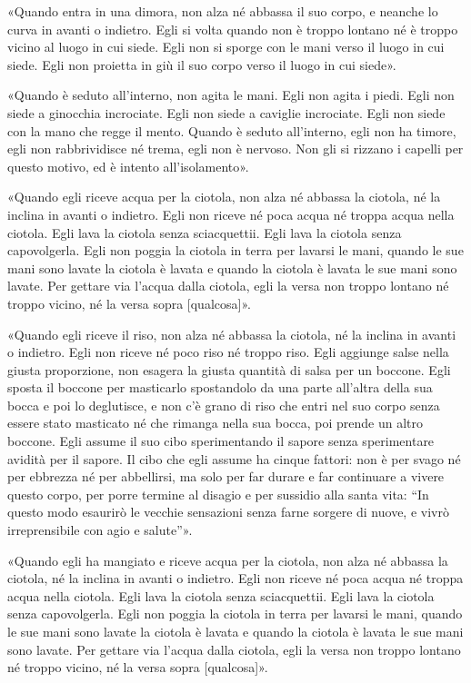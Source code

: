 «Quando entra in una dimora, non alza né abbassa il suo corpo, e neanche lo
curva in avanti o indietro. Egli si volta quando non è troppo lontano né è
troppo vicino al luogo in cui siede. Egli non si sporge con le mani verso il
luogo in cui siede. Egli non proietta in giù il suo corpo verso il luogo in cui
siede».

«Quando è seduto all’interno, non agita le mani. Egli non agita i piedi. Egli
non siede a ginocchia incrociate. Egli non siede a caviglie incrociate. Egli non
siede con la mano che regge il mento. Quando è seduto all’interno, egli non ha
timore, egli non rabbrividisce né trema, egli non è nervoso. Non gli si rizzano
i capelli per questo motivo, ed è intento all’isolamento».

«Quando egli riceve acqua per la ciotola, non alza né abbassa la ciotola, né la
inclina in avanti o indietro. Egli non riceve né poca acqua né troppa acqua
nella ciotola. Egli lava la ciotola senza sciacquettii. Egli lava la ciotola
senza capovolgerla. Egli non poggia la ciotola in terra per lavarsi le mani,
quando le sue mani sono lavate la ciotola è lavata e quando la ciotola è lavata
le sue mani sono lavate. Per gettare via l’acqua dalla ciotola, egli la versa
non troppo lontano né troppo vicino, né la versa sopra [qualcosa]».

«Quando egli riceve il riso, non alza né abbassa la ciotola, né la inclina in
avanti o indietro. Egli non riceve né poco riso né troppo riso. Egli aggiunge
salse nella giusta proporzione, non esagera la giusta quantità di salsa per un
boccone. Egli sposta il boccone per masticarlo spostandolo da una parte
all’altra della sua bocca e poi lo deglutisce, e non c’è grano di riso che entri
nel suo corpo senza essere stato masticato né che rimanga nella sua bocca, poi
prende un altro boccone. Egli assume il suo cibo sperimentando il sapore senza
sperimentare avidità per il sapore. Il cibo che egli assume ha cinque fattori:
non è per svago né per ebbrezza né per abbellirsi, ma solo per far durare e far
continuare a vivere questo corpo, per porre termine al disagio e per sussidio
alla santa vita: “In questo modo esaurirò le vecchie sensazioni senza farne
sorgere di nuove, e vivrò irreprensibile con agio e salute”».

«Quando egli ha mangiato e riceve acqua per la ciotola, non alza né abbassa la
ciotola, né la inclina in avanti o indietro. Egli non riceve né poca acqua né
troppa acqua nella ciotola. Egli lava la ciotola senza sciacquettii. Egli lava
la ciotola senza capovolgerla. Egli non poggia la ciotola in terra per lavarsi
le mani, quando le sue mani sono lavate la ciotola è lavata e quando la ciotola
è lavata le sue mani sono lavate. Per gettare via l’acqua dalla ciotola, egli la
versa non troppo lontano né troppo vicino, né la versa sopra [qualcosa]».

